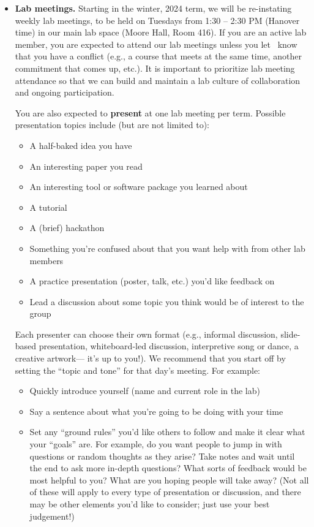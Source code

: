 \documentclass{tufte-book} %
\begin{document}
\begin{itemize}
  \item \textbf{Lab meetings.} Starting in the winter, 2024 term, we will be re-instating weekly lab
meetings, to be held on Tuesdays from 1:30 -- 2:30 PM (Hanover time)
in our main lab space (Moore Hall, Room 416).  If you are an active
lab member, you are expected to attend our lab meetings unless you
let \director~know that you have a conflict (e.g., a course that meets
at the same time, another commitment that comes up, etc.).  It is
important to prioritize lab meeting attendance so that we can build
and maintain a lab culture of collaboration and ongoing participation.

You are also expected to \textbf{present} at one lab meeting per
term.  Possible presentation topics include (but are not limited to):
\begin{itemize}
  \item A half-baked idea you have
  \item An interesting paper you read
  \item An interesting tool or software package you learned about
  \item A tutorial
  \item A (brief) hackathon
  \item Something you're confused about that you want help with from
    other lab members
  \item A practice presentation (poster, talk, etc.) you'd like
    feedback on
  \item Lead a discussion about some topic you think would be of
    interest to the group
\end{itemize}
Each presenter can choose their own format (e.g., informal discussion,
slide-based presentation, whiteboard-led discussion, interpretive
song or dance, a creative artwork--- it's up to you!).  We recommend
that you start off by setting the ``topic and tone'' for
that day's meeting.  For example:
\begin{itemize}
    \item Quickly introduce yourself (name and current role in the
      lab)
    \item Say a sentence about what you're going to be doing with your
      time
    \item Set any ``ground rules'' you'd like others to follow and
      make it clear what your ``goals'' are.  For
      example, do you want people to jump in with questions or random
      thoughts as they arise?  Take notes and wait until the end to
      ask more in-depth questions?  What sorts of feedback would be
      most helpful to you?  What are you hoping people will take away?
      (Not all of these will apply to every type of presentation or
      discussion, and there may be other elements you'd like to
      consider; just use your best judgement!)
  \end{itemize}


\end{itemize}
\end{document}
